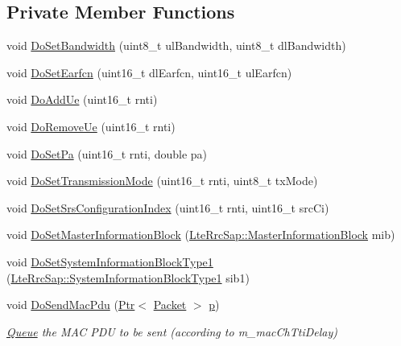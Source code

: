 \subsection*{Private Member Functions}
\begin{DoxyCompactItemize}
\item 
void \hyperlink{classns3_1_1LteEnbPhy_ab2d7ef87334ae3e6d0a353081e9b17a3}{Do\+Set\+Bandwidth} (uint8\+\_\+t ul\+Bandwidth, uint8\+\_\+t dl\+Bandwidth)
\item 
void \hyperlink{classns3_1_1LteEnbPhy_a4bc56a0a68166194e7e1f86fd947a662}{Do\+Set\+Earfcn} (uint16\+\_\+t dl\+Earfcn, uint16\+\_\+t ul\+Earfcn)
\item 
void \hyperlink{classns3_1_1LteEnbPhy_ab19bcb72ee48156d9ffa18e02307a3be}{Do\+Add\+Ue} (uint16\+\_\+t rnti)
\item 
void \hyperlink{classns3_1_1LteEnbPhy_aa0913fd7e791f221ba5af1b42468f9b2}{Do\+Remove\+Ue} (uint16\+\_\+t rnti)
\item 
void \hyperlink{classns3_1_1LteEnbPhy_a81e928f21e54aaad3841a30f497610ef}{Do\+Set\+Pa} (uint16\+\_\+t rnti, double pa)
\item 
void \hyperlink{classns3_1_1LteEnbPhy_a8858c94c79cbbdd7a4127e4f4fa409b8}{Do\+Set\+Transmission\+Mode} (uint16\+\_\+t rnti, uint8\+\_\+t tx\+Mode)
\item 
void \hyperlink{classns3_1_1LteEnbPhy_a653797be2decd49ea8ccd35c79678e18}{Do\+Set\+Srs\+Configuration\+Index} (uint16\+\_\+t rnti, uint16\+\_\+t src\+Ci)
\item 
void \hyperlink{classns3_1_1LteEnbPhy_a2cdf1061a975ece8e5ffff1b0319e6fd}{Do\+Set\+Master\+Information\+Block} (\hyperlink{structns3_1_1LteRrcSap_1_1MasterInformationBlock}{Lte\+Rrc\+Sap\+::\+Master\+Information\+Block} mib)
\item 
void \hyperlink{classns3_1_1LteEnbPhy_ab76283752348f5661e55a3e9bb48f56a}{Do\+Set\+System\+Information\+Block\+Type1} (\hyperlink{structns3_1_1LteRrcSap_1_1SystemInformationBlockType1}{Lte\+Rrc\+Sap\+::\+System\+Information\+Block\+Type1} sib1)
\item 
void \hyperlink{classns3_1_1LteEnbPhy_ae1c1d93b22eac795484afcfcad473e05}{Do\+Send\+Mac\+Pdu} (\hyperlink{classns3_1_1Ptr}{Ptr}$<$ \hyperlink{classns3_1_1Packet}{Packet} $>$ \hyperlink{lte__link__budget__x2__handover__measures_8m_ac9de518908a968428863f829398a4e62}{p})
\begin{DoxyCompactList}\small\item\em \hyperlink{classns3_1_1Queue}{Queue} the M\+AC P\+DU to be sent (according to m\+\_\+mac\+Ch\+Tti\+Delay) \end{DoxyCompactList}\item 

\end{DoxyCompactItemize}
